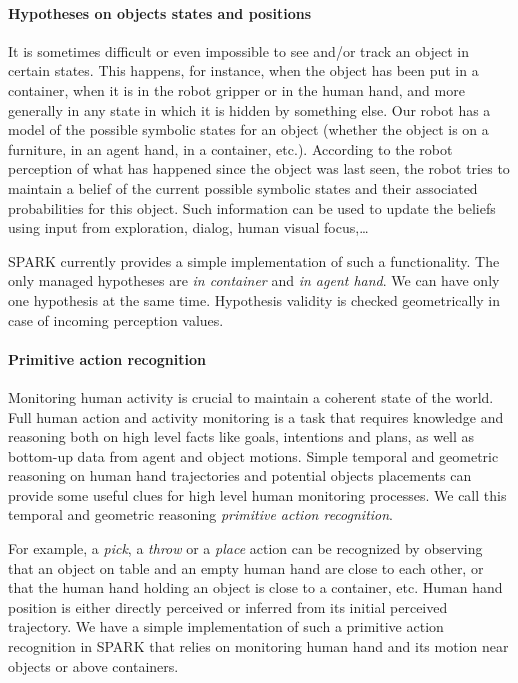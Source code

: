\documentclass[preprint,5p]{elsarticle}
\begin{document}
\paragraph{Hypotheses on objects states and positions}
It is sometimes difficult or even impossible to see and/or track an
object in certain states. This happens, for instance, when the object
has been put in a container, when it is in the robot gripper or in the
human hand, and more generally in any state in which it is hidden by
something else. Our robot has a model of the possible symbolic states
for an object (whether the object is on a furniture, in an agent hand,
in a container, etc.).  According to the robot perception of what has
happened since the object was last seen, the robot tries to maintain a
belief of the current possible symbolic states and their associated
probabilities for this object. Such information can be used to update
the beliefs using input from exploration, dialog, human visual
focus,\ldots {}

SPARK currently provides a simple implementation of such a functionality. The
only managed hypotheses are \emph{in container} and \emph{in agent hand}. We
can have only one hypothesis at the same time. Hypothesis validity is checked
geometrically in case of incoming perception values.


\paragraph{Primitive action recognition} Monitoring human activity is crucial
to maintain a coherent state of the world. Full human action and activity
monitoring is a task that requires knowledge and reasoning both on high level
facts like goals, intentions and plans, as well as bottom-up data from agent
and object motions. Simple temporal and geometric reasoning on human hand
trajectories and potential objects placements can provide some useful clues for
high level human monitoring processes. We call this temporal and geometric
reasoning \emph{primitive action recognition}.

For example, a \emph{pick}, a \emph{throw} or a \emph{place} action
can be recognized by observing that an object on table and an empty
human hand are close to each other, or that the human hand holding an
object is close to a container, etc. Human hand position is either
directly perceived or inferred from its initial perceived trajectory.
We have a simple implementation of such a primitive action recognition
in SPARK that relies on monitoring human hand and its motion near
objects or above containers.
\end{document}
